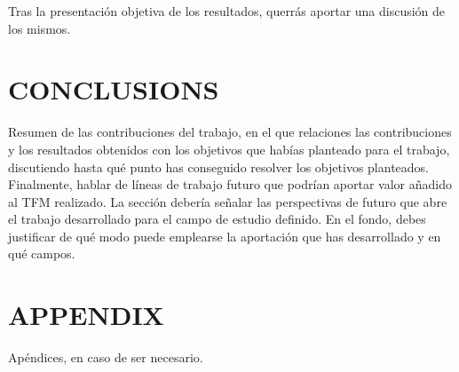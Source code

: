 \documentclass[11pt,a4paper,USenglish,twocolumn]{article}
\begin{document}
Tras la presentación objetiva de los resultados, querrás aportar una discusión de los mismos.

\section{CONCLUSIONS}

Resumen de las contribuciones del trabajo, en el que relaciones las contribuciones y los resultados obtenidos con los objetivos que habías planteado para el trabajo, discutiendo hasta qué punto has conseguido resolver los objetivos planteados.
Finalmente, hablar de líneas de trabajo futuro que podrían aportar valor añadido al TFM realizado. La sección debería señalar las perspectivas de futuro que abre el trabajo desarrollado para el campo de estudio definido. En el fondo, debes justificar de qué modo puede emplearse la aportación que has desarrollado y en qué campos.

\appendix
\section{APPENDIX}
Apéndices, en caso de ser necesario.

\renewcommand{\refname}{REFERENCES}


\end{document}
